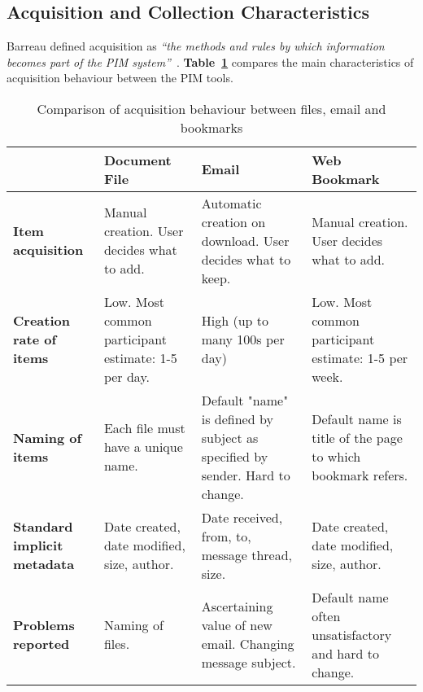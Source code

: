\subsection{Acquisition and Collection Characteristics}
\label{exp-study:comparison-acquisition}

Barreau defined acquisition as \textit{``the methods and rules by which information becomes part of the PIM system''}~\citep{barreau:95}. \textbf{Table~\ref{table:chapter3_acquisition_strategy}} compares the main characteristics of acquisition behaviour between the PIM tools.

\begin{table}[hbtp]
\begin{center}
\begin{footnotesize}
\setlength{\extrarowheight}{2pt}
\begin{tabular}{|p{2.5cm}|p{3.5cm}|p{3.5cm}|p{3.5cm}|}
\hline
    {\bf } & {\bf Document File} & {\bf Email} & {\bf Web Bookmark} \\
\hline
{\bf Item acquisition} & Manual creation. User decides what to add. & Automatic creation on download. User decides what to keep. & Manual creation. User decides what to add. \\
\hline
{\bf Creation rate of items} & Low. Most common participant estimate: 1-5 per day. & High (up to many 100s per day) & Low. Most common participant estimate: 1-5 per week. \\
\hline
{\bf Naming of items} & Each file must have a unique name. & Default "name" is defined by subject as specified by sender. Hard to change. & Default name is title of the page to which bookmark refers. \\
\hline
{\bf Standard implicit metadata } & Date created, date modified, size, author. & Date received, from, to, message thread, size. & Date created, date modified, size, author. \\
\hline
{\bf Problems reported} & Naming of files. & Ascertaining value of new email. Changing message subject. & Default name often unsatisfactory and hard to change. \\
\hline
\end{tabular}    
\end{footnotesize}
\caption{Comparison of acquisition behaviour between files, email and bookmarks}
\label{table:chapter3_acquisition_strategy}
\end{center}
\end{table}


